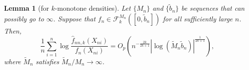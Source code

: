 \documentclass[12pt,letterpaper, twoside, openany]{article}
\theoremstyle{plain}
\newtheorem{lemma}[theorem]{Lemma}
\begin{document}
%		
%	

\begin{lemma}[for $k$-monotone densities]\label{thm:bootstrap_Kn_rate}
Let $\{M_n\}$ and $\{ \tilde{b}_n\}$ be sequences that can possibly go to $\infty$.	Suppose that $f_n \in \mathcal{F}_k^{M_n}([0, \tilde{b}_n])$ for all sufficiently large $n$. Then,
\begin{equation*}
	\frac{1}{n} \sum^n_{i=1} \log \frac{ \hat{f}_{nn,k}(X_{ni})}{f_n(X_{ni})} = O_p\left ( n^{-\frac{2k}{2k+1}}|\log  (\widetilde{M}_n \tilde{b}_n )|^{\frac{1}{2k+1}}\right),
\end{equation*}
where $\widetilde{M}_n$ satisfies $\widetilde{M}_n/M_n \rightarrow \infty$.
\end{lemma}
\end{document}

